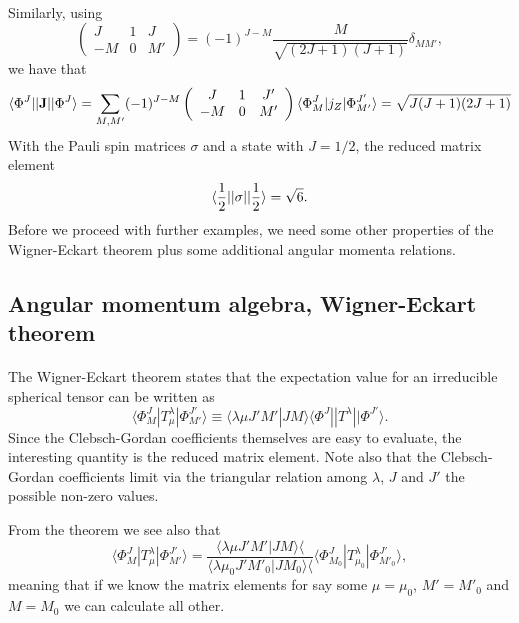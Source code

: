 \documentclass[%
twoside,                 %
final,                   %
10pt]{article}
\begin{document}
\paragraph{}
Similarly, using 
\[
\left(\begin{array}{ccc}  J & 1 & J \\ -M & 0 & M'\end{array}\right)=(-1)^{J-M}\frac{M}{\sqrt{(2J+1)(J+1)}}\delta_{MM'},
\]
we have that 
\[
\langle \Phi^J||{\bf J}||\Phi^{J}\rangle=\sum_{M,M'}(-1)^{J-M}\left(\begin{array}{ccc}  J & 1 & J' \\ -M & 0 & M'\end{array}\right)\langle \Phi^J_M|j_Z|\Phi^{J'}_{M'}\rangle=\sqrt{J(J+1)(2J+1)}
\]
With the Pauli spin matrices $\sigma$ and a state with $J=1/2$, the reduced matrix element
\[
\langle \frac{1}{2}||{\bf \sigma}||\frac{1}{2}\rangle=\sqrt{6}.
\] 
Before we proceed with further examples, we need some other properties of the Wigner-Eckart theorem plus some additional angular momenta relations.


\subsection{Angular momentum algebra, Wigner-Eckart theorem}

\paragraph{}
The Wigner-Eckart theorem states that the  expectation value for an irreducible spherical tensor can be written as
\[
\langle \Phi^J_M|T^{\lambda}_{\mu}|\Phi^{J'}_{M'}\rangle\equiv\langle \lambda \mu J'M'|JM\rangle\langle \Phi^J||T^{\lambda}||\Phi^{J'}\rangle.
\]
Since the Clebsch-Gordan coefficients themselves are easy to evaluate, the interesting quantity is the reduced matrix element. Note also that 
the Clebsch-Gordan coefficients limit via the triangular relation among $\lambda$, $J$ and $J'$ the possible non-zero values.

From the theorem we see also that 
\[
\langle \Phi^J_M|T^{\lambda}_{\mu}|\Phi^{J'}_{M'}\rangle=\frac{\langle \lambda \mu J'M'|JM\rangle\langle }{\langle \lambda \mu_0 J'M'_0|JM_0\rangle\langle }\langle \Phi^J_{M_0}|T^{\lambda}_{\mu_0}|\Phi^{J'}_{M'_0}\rangle,
\]
meaning that if we know the matrix elements for say some $\mu=\mu_0$, $M'=M'_0$ and $M=M_0$ we can calculate all other.
\end{document}
